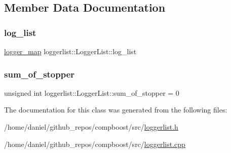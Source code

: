 \subsection{Member Data Documentation}
\mbox{\label{classloggerlist_1_1_logger_list_a56997d07c587921a70b0b2c6538ce1f0}} 
\subsubsection{\texorpdfstring{log\+\_\+list}{log\_list}}
{\footnotesize\ttfamily \hyperlink{loggerlist_8h_afa233b5ec9ffbe76605d913e86d40fe6}{logger\+\_\+map} loggerlist\+::\+Logger\+List\+::log\+\_\+list\hspace{0.3cm}{\ttfamily [private]}}

\mbox{\label{classloggerlist_1_1_logger_list_a39c3b4cf8f01c0e29606a9b2537da347}} 
\subsubsection{\texorpdfstring{sum\+\_\+of\+\_\+stopper}{sum\_of\_stopper}}
{\footnotesize\ttfamily unsigned int loggerlist\+::\+Logger\+List\+::sum\+\_\+of\+\_\+stopper = 0\hspace{0.3cm}{\ttfamily [private]}}



The documentation for this class was generated from the following files\+:\begin{DoxyCompactItemize}
\item 
/home/daniel/github\+\_\+repos/compboost/src/\hyperlink{loggerlist_8h}{loggerlist.\+h}\item 
/home/daniel/github\+\_\+repos/compboost/src/\hyperlink{loggerlist_8cpp}{loggerlist.\+cpp}\end{DoxyCompactItemize}
